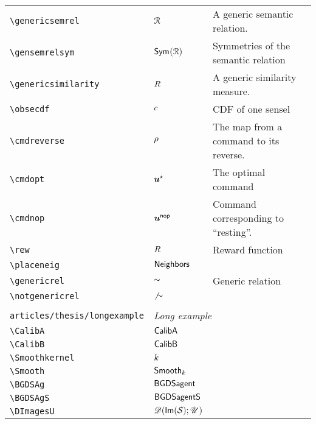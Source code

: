 \begin{longtable}{lll}
 {\color[rgb]{0.5,0.5,0.5}\texttt{\textbackslash genericsemrel}} & $\mathcal{R}$ &  A generic semantic relation.\\ 
 {\color[rgb]{0.5,0.5,0.5}\texttt{\textbackslash gensemrelsym}} & $\mathsf{Sym}^{}(\mathcal{R})$ &  Symmetries of the semantic relation\\ 
 {\color[rgb]{0.5,0.5,0.5}\texttt{\textbackslash genericsimilarity}} & $R$ &  A generic similarity measure.\\ 
 {\color[rgb]{0.5,0.5,0.5}\texttt{\textbackslash obsecdf}} & ${c}$ &  CDF of one sensel\\ 
 {\color[rgb]{0.5,0.5,0.5}\texttt{\textbackslash cmdreverse}} & $\rho$ &  The map from a command to its reverse.\\ 
 {\color[rgb]{0.5,0.5,0.5}\texttt{\textbackslash cmdopt}} & $\boldsymbol{u}^\star$ &  The optimal command\\ 
 {\color[rgb]{0.5,0.5,0.5}\texttt{\textbackslash cmdnop}} & $\boldsymbol{u}^{\mathsf{nop}}$ &  Command corresponding to ``resting''.\\ 
 {\color[rgb]{0.5,0.5,0.5}\texttt{\textbackslash rew}} & $R$ &  Reward function\\ 
 {\color[rgb]{0.5,0.5,0.5}\texttt{\textbackslash placeneig}} & $\mathsf{Neighbors}$ & \\ 
 {\color[rgb]{0.5,0.5,0.5}\texttt{\textbackslash genericrel}} & $\sim$ &  Generic relation\\ 
 {\color[rgb]{0.5,0.5,0.5}\texttt{\textbackslash notgenericrel}} & $\not{\sim}$ & \\ 
  &  & \\ 
 {\color[rgb]{0.5,0.5,0.5}\texttt{articles/thesis/longexample}} & \multicolumn{2}{l}{\emph{Long example}}\\ 
 \hline
{\color[rgb]{0.5,0.5,0.5}\texttt{\textbackslash CalibA}} & $\textsf{{CalibA}}$ & \\ 
 {\color[rgb]{0.5,0.5,0.5}\texttt{\textbackslash CalibB}} & $\textsf{{CalibB}}$ & \\ 
 {\color[rgb]{0.5,0.5,0.5}\texttt{\textbackslash Smoothkernel}} & $k$ & \\ 
 {\color[rgb]{0.5,0.5,0.5}\texttt{\textbackslash Smooth}} & $\textsf{{Smooth}}_{k}$ & \\ 
 {\color[rgb]{0.5,0.5,0.5}\texttt{\textbackslash BGDSAg}} & $\textsf{{BGDSagent}}$ & \\ 
 {\color[rgb]{0.5,0.5,0.5}\texttt{\textbackslash BGDSAgS}} & $\textsf{{BGDSagentS}}$ & \\ 
 {\color[rgb]{0.5,0.5,0.5}\texttt{\textbackslash DImagesU}} & $\DImagesU$ & \\ 

\end{longtable}
